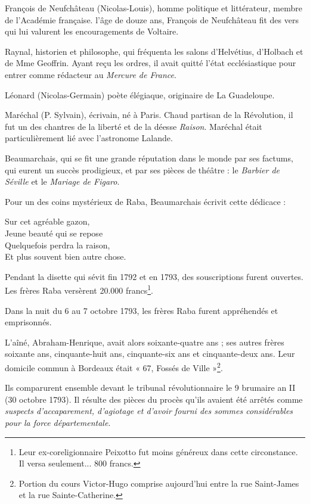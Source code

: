 François de Neufchâteau (Nicolas-Louis), homme politique et littérateur, membre de l'Académie française. l'âge de douze ans, François de Neufchâteau fit des vers qui lui valurent les encouragements de Voltaire.

Raynal, historien et philosophe, qui fréquenta les salons d'Helvétius, d'Holbach et de Mme Geoffrin. Ayant reçu les ordres, il avait quitté l'état ecclésiastique pour entrer comme rédacteur au \textit{Mercure de France}.

Léonard (Nicolas-Germain) poète élégiaque, originaire de La Guadeloupe.

Maréchal (P. Sylvain), écrivain, né à Paris. Chaud partisan de la Révolution, il fut un des chantres de la liberté et de la déesse \textit{Raison}. Maréchal était particulièrement lié avec l'astronome Lalande.

Beaumarchais, qui se fit une grande réputation dans le monde par ses factums, qui eurent un succès prodigieux, et par ses pièces de théâtre : le \textit{Barbier de Séville} et le \textit{Mariage de Figaro}.

Pour un des coins mystérieux de Raba, Beaumarchais écrivit cette dédicace : 

\begin{center}
Sur cet agréable gazon,\\
Jeune beauté qui se repose\\
Quelquefois perdra la raison,\\
Et plus souvent bien autre chose. 
\end{center}

\asterism{}

Pendant la disette qui sévit fin 1792 et en 1793, des souscriptions furent ouvertes. Les frères Raba versèrent 20.000 francs\footnote{Leur ex-coreligionnaire Peixotto fut moins généreux dans cette circonstance. Il versa seulement... 800 francs.}.

Dans la nuit du 6 au 7 octobre 1793, les frères Raba furent appréhendés et emprisonnés.

L'aîné, Abraham-Henrique, avait alors soixante-quatre ans ; ses autres frères soixante ans, cinquante-huit ans, cinquante-six ans et cinquante-deux ans. Leur domicile commun à Bordeaux était « 67, Fossés de Ville »\footnote{Portion du cours Victor-Hugo comprise aujourd'hui entre la rue Saint-James et la rue Sainte-Catherine.}.

Ils comparurent ensemble devant le tribunal révolutionnaire le 9 brumaire an II (30 octobre 1793). Il résulte des pièces du procès qu'ils avaient été arrêtés comme \textit{suspects d'accaparement, d'agiotage et d'avoir fourni des sommes considérables pour la force départementale}.

